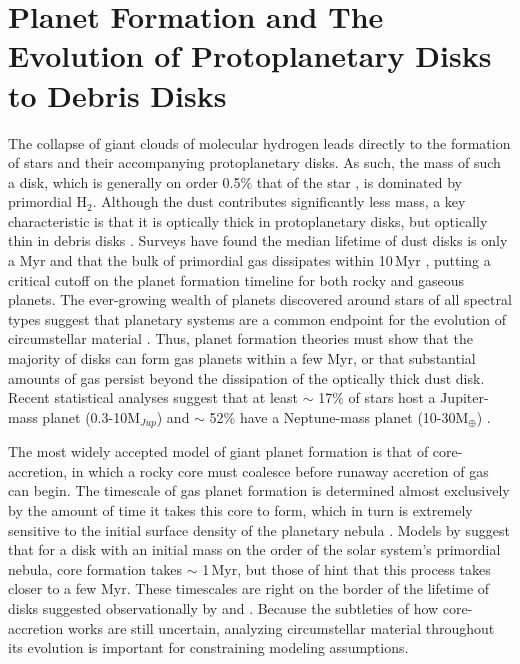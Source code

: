 \section{Planet Formation and The Evolution of Protoplanetary Disks to Debris Disks}

The collapse of giant clouds of molecular hydrogen leads directly to the formation of stars and their accompanying protoplanetary disks. As such, the mass of such a disk, which is generally on order 0.5$\%$ that of the star \citep{Andr13}, is dominated by primordial H$_{2}$. Although the dust contributes significantly less mass, a key characteristic is that it is optically thick in protoplanetary disks, but optically thin in debris disks \citep{Wyat14}. Surveys have found the median lifetime of dust disks is only a Myr \citep{Mama09} and that the bulk of primordial gas dissipates within 10\,Myr \citep{Zuck95}, putting a critical cutoff on the planet formation timeline for both rocky and gaseous planets. The ever-growing wealth of planets discovered around stars of all spectral types suggest that planetary systems are a common endpoint for the evolution of circumstellar material \citep{Howa13}. Thus, planet formation theories must show that the majority of disks can form gas planets within a few Myr, or that substantial amounts of gas persist beyond the dissipation of the optically thick dust disk. Recent statistical analyses suggest that at least $\sim$ 17$\%$ of stars host a Jupiter-mass planet (0.3-10M$_{Jup}$) and $\sim$ 52$\%$ have a Neptune-mass planet (10-30M$_{\oplus}$) \citep{Cass12}. 

The most widely accepted model of giant planet formation is that of core-accretion, in which a rocky core must coalesce before runaway accretion of gas can begin. The timescale of gas planet formation is determined almost exclusively by the amount of time it takes this core to form, which in turn is extremely sensitive to the initial surface density of the planetary nebula \citep{Poll86,Poll96}. Models by \cite{Alib05} suggest that for a disk with an initial mass on the order of the solar system's primordial nebula, core formation takes $\sim$ 1\,Myr, but those of \cite{Inab03} hint that this process takes closer to a few Myr. These timescales are right on the border of the lifetime of disks suggested observationally by \citeauthor{Mama09} and \citeauthor{Zuck95}. Because the subtleties of how core-accretion works are still uncertain, analyzing circumstellar material throughout its evolution is important for constraining modeling assumptions. 

